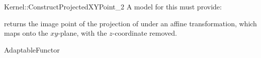 \begin{ccRefFunctionObjectConcept}{Kernel::ConstructProjectedXYPoint_2}
A model for this must provide:


       {returns the image point of the projection of  under an affine
        transformation, which maps  onto the $xy$-plane, with the
        $z$-coordinate removed.}

\ccRefines
AdaptableFunctor

\ccSeeAlso
{}\\

\end{ccRefFunctionObjectConcept}
